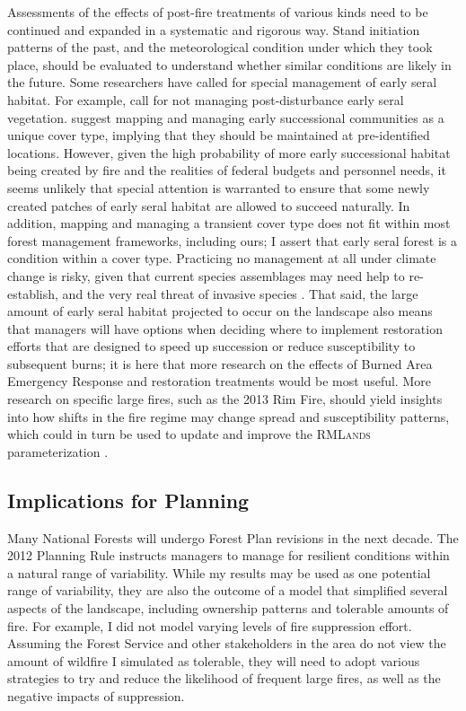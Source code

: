Assessments of the effects of post-fire treatments of various kinds need to be continued and expanded in a systematic and rigorous way. Stand initiation patterns of the past, and the meteorological condition under which they took place, should be evaluated to understand whether similar conditions are likely in the future. Some researchers have called for special management of early seral habitat. For example, \citet{Dellasala2014} call for not managing post-disturbance early seral vegetation. \citet{Swanson2011} suggest mapping and managing early successional communities as a unique cover type, implying that they should be maintained at pre-identified locations. However, given the high probability of more early successional habitat being created by fire and the realities of federal budgets and personnel needs, it seems unlikely that special attention is warranted to ensure that some newly created patches of early seral habitat are allowed to succeed naturally. In addition, mapping and managing a transient cover type does not fit within most forest management frameworks, including ours; I assert that early seral forest is a condition within a cover type. Practicing no management at all under climate change is risky, given that current species assemblages may need help to re-establish, and the very real threat of invasive species \citep{Stephens2010}. That said, the large amount of early seral habitat projected to occur on the landscape also means that managers will have options when deciding where to implement restoration efforts that are designed to speed up succession or reduce susceptibility to subsequent burns; it is here that more research on the effects of Burned Area Emergency Response and restoration treatments would be most useful. More research on specific large fires, such as the 2013 Rim Fire, should yield insights into how shifts in the fire regime may change spread and susceptibility patterns, which could in turn be used to update and improve the \textsc{RMLands} parameterization \citep{Lydersen2014}.




\subsection*{Implications for Planning}
Many National Forests will undergo Forest Plan revisions in the next decade. The 2012 Planning Rule instructs managers to manage for resilient conditions within a natural range of variability. While my results may be used as one potential range of variability, they are also the outcome of a model that simplified several aspects of the landscape, including ownership patterns and tolerable amounts of fire. For example, I did not model varying levels of fire suppression effort. Assuming the Forest Service and other stakeholders in the area do not view the amount of wildfire I simulated as tolerable, they will need to adopt various strategies to try and reduce the likelihood of frequent large fires, as well as the negative impacts of suppression. 

